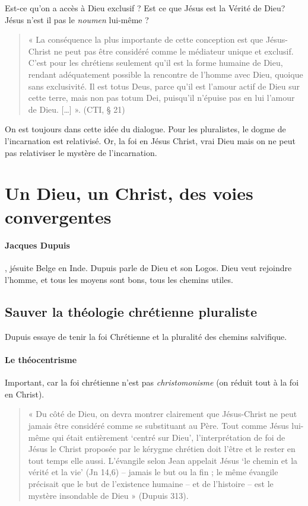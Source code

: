 Est-ce qu'on a accès à Dieu exclusif ? Est ce que Jésus est la Vérité de Dieu? 
Jésus n'est il pas le \textit{noumen} lui-même ?

\begin{quote}
    « La conséquence la plus importante de cette conception est que Jésus-Christ ne peut pas être considéré comme le médiateur unique et exclusif. C’est pour les chrétiens seulement qu’il est la forme humaine de Dieu, rendant adéquatement possible la rencontre de l’homme avec Dieu, quoique sans exclusivité. Il est totus Deus, parce qu’il est l’amour actif de Dieu sur cette terre, mais non pas totum Dei, puisqu’il n’épuise pas en lui l’amour de Dieu. […] ». (CTI, § 21) 
\end{quote}

On est toujours dans cette idée du dialogue. Pour les pluralistes, le dogme de l'incarnation est relativisé. Or, la foi en Jésus Christ, vrai Dieu mais on ne peut pas relativiser le mystère de l'incarnation. 


\section{Un Dieu, un Christ, des voies convergentes}

\paragraph{Jacques Dupuis}, jésuite Belge en Inde. Dupuis parle de Dieu et son Logos. Dieu veut rejoindre l'homme, et tous les moyens sont bons, tous les chemins utiles.

\subsection{Sauver la théologie chrétienne pluraliste}   
 Dupuis essaye de tenir la foi Chrétienne et la pluralité des chemins salvifique.
 
 \paragraph{Le théocentrisme } Important, car la foi chrétienne n'est pas \textit{christomonisme } (on réduit tout à la foi en Christ). 
 
 \begin{quote}
     « Du côté de Dieu, on devra montrer clairement que Jésus-Christ ne peut jamais être considéré comme se substituant au Père. Tout comme Jésus lui-même qui était entièrement ‘centré sur Dieu’, l’interprétation de foi de Jésus le Christ proposée par le kérygme chrétien doit l’être et le rester en tout temps elle aussi. L’évangile selon Jean appelait Jésus ‘le chemin et la vérité et la vie’ (Jn 14,6) – jamais le but ou la fin ; le même évangile précisait que le but de l’existence humaine – et de l’histoire – est le mystère insondable de Dieu »  (Dupuis 313). 
 \end{quote}
 
